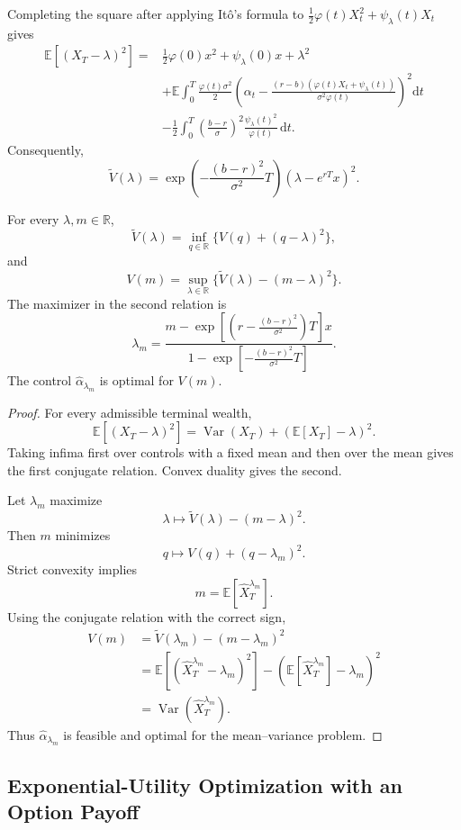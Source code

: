 Completing the square after applying It\^o's formula to
\(\frac12\varphi(t)X_t^2+\psi_\lambda(t)X_t\) gives
\[
\begin{aligned}
\mathbb E[(X_T-\lambda)^2]
={}&\frac12\varphi(0)x^2+\psi_\lambda(0)x+\lambda^2\\
&+\mathbb E\int_0^T
\frac{\varphi(t)\sigma^2}{2}
\left(
\alpha_t-
\frac{(r-b)(\varphi(t)X_t+\psi_\lambda(t))}
{\sigma^2\varphi(t)}
\right)^2\mathrm dt\\
&-\frac12\int_0^T
\left(\frac{b-r}{\sigma}\right)^2
\frac{\psi_\lambda(t)^2}{\varphi(t)}\,\mathrm dt.
\end{aligned}
\]
Consequently,
\[
\widetilde V(\lambda)
=\exp\!\left(-\frac{(b-r)^2}{\sigma^2}T\right)
(\lambda-e^{rT}x)^2.
\]

\begin{prop}
For every \(\lambda,m\in\mathbb R\),
\[
\widetilde V(\lambda)
=\inf_{q\in\mathbb R}
\{V(q)+(q-\lambda)^2\},
\]
and
\[
V(m)
=\sup_{\lambda\in\mathbb R}
\{\widetilde V(\lambda)-(m-\lambda)^2\}.
\]
The maximizer in the second relation is
\[
\lambda_m
=\frac{
 m-
 \exp\!\left[
 \left(r-\frac{(b-r)^2}{\sigma^2}\right)T
 \right]x
}{
1-
\exp\!\left[-\frac{(b-r)^2}{\sigma^2}T\right]
}.
\]
The control \(\hat\alpha_{\lambda_m}\) is optimal for \(V(m)\).
\end{prop}

\begin{proof}
For every admissible terminal wealth,
\[
\mathbb E[(X_T-\lambda)^2]
=\operatorname{Var}(X_T)
+(\mathbb E[X_T]-\lambda)^2.
\]
Taking infima first over controls with a fixed mean and then over the mean gives the first conjugate relation. Convex duality gives the second.

Let \(\lambda_m\) maximize
\[
\lambda\mapsto
\widetilde V(\lambda)-(m-\lambda)^2.
\]
Then \(m\) minimizes
\[
q\mapsto V(q)+(q-\lambda_m)^2.
\]
Strict convexity implies
\[
m=\mathbb E[\hat X_T^{\lambda_m}].
\]
Using the conjugate relation with the correct sign,
\[
\begin{aligned}
V(m)
&=\widetilde V(\lambda_m)-(m-\lambda_m)^2\\
&=\mathbb E[(\hat X_T^{\lambda_m}-\lambda_m)^2]
-(\mathbb E[\hat X_T^{\lambda_m}]-\lambda_m)^2\\
&=\operatorname{Var}(\hat X_T^{\lambda_m}).
\end{aligned}
\]
Thus \(\hat\alpha_{\lambda_m}\) is feasible and optimal for the mean--variance problem.
\end{proof}

\subsection{Exponential-Utility Optimization with an Option Payoff}

